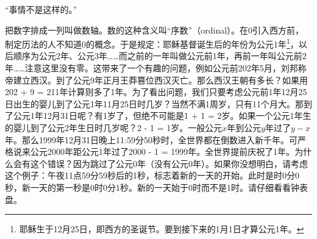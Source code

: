 \documentclass[b5paper]{ctexart}
\begin{document}
“事情不是这样的。”

\begin{center}
\end{center}

  
把数字排成一列叫做数轴。数的这种含义叫“序数”（ordinal）。在0引入西方前，制定历法的人不知道0的概念。于是规定：耶稣基督诞生后的年份为公元1年\footnote{耶稣生于12月25日，即西方的圣诞节。要到接下来的1月1日才算公元1年。}，以后顺序为公元2年、公元3年……而之前的一年叫做公元前1年，再前一年叫公元前2年……注意这里没有零。这带来了一个有趣的问题，例如公元前202年5月，刘邦称帝建立西汉。到了公元9年正月王莽篡位西汉灭亡。那么西汉王朝有多长？如果用202 + 9 = 211年计算则多了1年。为了看出问题，我们只要考虑公元前1年12月25日出生的婴儿到了公元1年11月25日时几岁？当然不满1周岁，只有11个月大。那到了公元1年12月31日呢？有1岁了，但绝不可能是1 + 1 = 2岁。如果一个公元1年生的婴儿到了公元2年生日时几岁呢？2 - 1 = 1岁。一般公元$x$年到公元$y$年过了$y - x$年。那么1999年12月31日晚上11:59分50秒时，全世界都在倒数进入新千年。可严格说来公元2000年距公元1年过了2000 - 1 = 1999年。全世界提前庆祝了1年。为什么会有这个错误？因为跳过了公元0年（没有公元0年）。如果你没想明白，请考虑这个例子：午夜11点59分59秒后的1秒，标志着新的一天的开始。此时是时0分0秒，新一天的第一秒是0时0分1秒。新的一天始于0时而不是1时。请仔细看看钟表盘。
\end{document}
